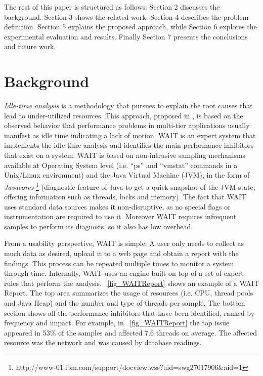 \documentclass[runningheads,a4paper]{llncs}
\begin{document}
The rest of this paper is structured as follows: Section 2 discusses the
background. Section 3 shows the related work. Section 4 describes the
problem definition. Section 5 explains the proposed approach, while Section 6
explores the experimental evaluation and results. Finally Section 7 presents the
conclusions and future work.

\vspace{-5pt}
\section{Background}
\vspace{-5pt}
\emph{Idle-time analysis} is a methodology that pursues to explain the root
causes that lead to under-utilized resources. This approach, proposed in
\cite{Altman2010}, is based on the observed behavior that performance problems in multi-tier
applications usually manifest as idle time indicating a lack of motion.
WAIT is an expert system that implements the idle-time analysis and identifies
the main performance inhibitors that exist on a system. WAIT is based on non-intrusive
sampling mechanisms available at Operating System level (i.e. ``ps'' and
``vmstat'' commands in a Unix/Linux environment) and the Java Virtual Machine
(JVM), in the form of \emph{Javacores}
\footnote{http://www-01.ibm.com/support/docview.wss?uid=swg27017906\&aid=1}
(diagnostic feature of Java to get a quick snapshot of the JVM state, offering
information such as threads, locks and memory). The fact that WAIT uses standard
data sources makes it non-disruptive, as no special flags or instrumentation are
required to use it. Moreover WAIT requires infrequent samples to perform its
diagnosis, so it also has low overhead.

From a usability perspective, WAIT is simple: A user only needs to collect as
much data as desired, upload it to a web page and obtain a report with the
findings. This process can be repeated multiple times to monitor a system
through time. Internally, WAIT uses an engine built on top of a set of expert
rules that perform the analysis. \figurename ~\ref{fig_WAITReport} shows an
example of a WAIT Report. The top area summarizes the usage of resources (i.e.
CPU, thread pools and Java Heap) and the number and type of threads per sample. 
The bottom section shows all the performance inhibitors that have been identified, ranked
by frequency and impact. For example, in \figurename ~\ref{fig_WAITReport} the
top issue appeared in 53\% of the samples and affected 7.6 threads on average.
The affected resource was the network and was caused by database readings.
\end{document}
